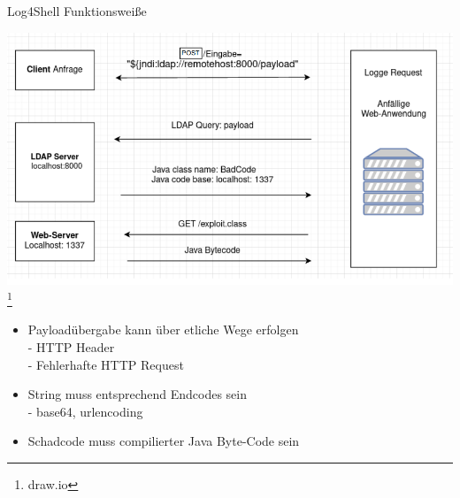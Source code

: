 \documentclass{beamer}
\begin{document}
\begin{frame}{Log4Shell Funktionsweiße}
\begin{center}
\includegraphics[scale=0.35]{log4s.png}\footnote{draw.io}
\end{center}
\end{frame}
\begin{frame}
 \begin{itemize}
 \item Payloadübergabe kann über etliche Wege erfolgen\\
  - HTTP Header\\
  - Fehlerhafte HTTP Request
  \item String muss entsprechend Endcodes sein\\
  - base64, urlencoding
  \item Schadcode muss compilierter Java Byte-Code sein
 \end{itemize}

\end{frame}
\end{document}
